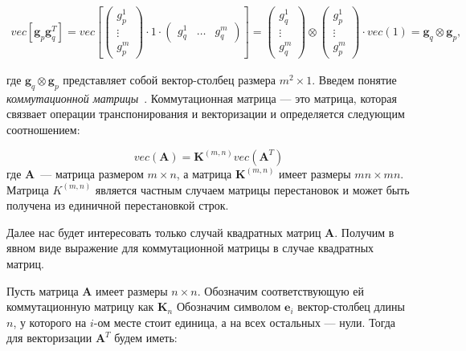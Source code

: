 \begin{gather}
    vec[\mathbf{g}_p \mathbf{g}_q^T] = vec\left[
        \begin{pmatrix}
            g_p^1 \\
            \vdots \\
            g_p^m
        \end{pmatrix}
    \cdot 1 \cdot
    \begin{pmatrix}
        g_q^1 & \dots & g_q^m
    \end{pmatrix}
    \right] = %
    \begin{pmatrix}
        g_q^1 \\
        \vdots \\
        g_q^m
    \end{pmatrix}
    \otimes
    \begin{pmatrix}
        g_p^1 \\
        \vdots \\
        g_p^m
    \end{pmatrix}
    \cdot
    vec(1) =
    \mathbf{g}_q \otimes \mathbf{g}_p,
\end{gather}


где $\mathbf{g}_q \otimes \mathbf{g}_p$ представляет собой вектор-столбец размера $m^2 \times 1$.
Введем понятие \emph{коммутационной матрицы}~\cite{neudecker}.
Коммутационная матрица --- это матрица, которая связвает операции транспонирования и векторизации
и определяется следующим соотношением:

\begin{equation}
    vec(\mathbf{A}) = \mathbf{K}^{(m,n)} vec(\mathbf{A}^T)
    \label{eq:commutation_matrix_def}
\end{equation}
где $\mathbf{A}$~--- матрица размером $m \times n$, а матрица $\mathbf{K}^{(m,n)}$ имеет размеры
$mn \times mn$.
Матрица $K^{(m,n)}$ является частным случаем матрицы перестановок и
может быть получена из единичной перестановкой строк.

Далее нас будет интересовать только случай квадратных матриц $\mathbf{A}$.
Получим в явном виде выражение для коммутационной матрицы в случае квадратных матриц.

Пусть матрица $\mathbf{A}$ имеет размеры $n \times n$. Обозначим соответствующую ей коммутационную матрицу
как $\mathbf{K}_n$
Обозначим символом $\mathbf{e}_i$ вектор-столбец длины $n$, у которого на $i$-ом месте стоит
единица, а на всех остальных --- нули. Тогда для векторизации $\mathbf{A}^T$ будем иметь:

